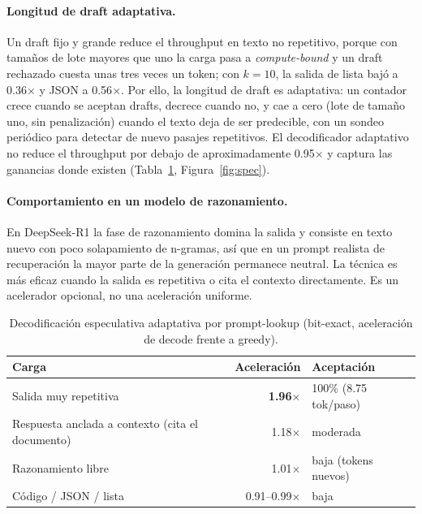 \documentclass[10pt,a4paper]{article}
\begin{document}
\paragraph{Longitud de draft adaptativa.} Un draft fijo y grande reduce el throughput en texto no repetitivo, porque con tamaños de lote mayores que uno la carga pasa a \emph{compute-bound} y un draft rechazado cuesta unas tres veces un token; con $k{=}10$, la salida de lista bajó a 0.36$\times$ y JSON a 0.56$\times$. Por ello, la longitud de draft es adaptativa: un contador crece cuando se aceptan drafts, decrece cuando no, y cae a cero (lote de tamaño uno, sin penalización) cuando el texto deja de ser predecible, con un sondeo periódico para detectar de nuevo pasajes repetitivos. El decodificador adaptativo no reduce el throughput por debajo de aproximadamente 0.95$\times$ y captura las ganancias donde existen (Tabla~\ref{tab:spec}, Figura~\ref{fig:spec}).

\paragraph{Comportamiento en un modelo de razonamiento.} En DeepSeek-R1 la fase de razonamiento domina la salida y consiste en texto nuevo con poco solapamiento de n-gramas, así que en un prompt realista de recuperación la mayor parte de la generación permanece neutral. La técnica es más eficaz cuando la salida es repetitiva o cita el contexto directamente. Es un acelerador opcional, no una aceleración uniforme.

\begin{table}[H]
\centering\small
\caption{Decodificación especulativa adaptativa por prompt-lookup (bit-exact, aceleración de decode frente a greedy).}
\label{tab:spec}
\begin{tabularx}{\textwidth}{Xrl}
\toprule
\textbf{Carga} & \textbf{Aceleración} & \textbf{Aceptación} \\
\midrule
Salida muy repetitiva & \textbf{1.96$\times$} & 100\% (8.75 tok/paso) \\
Respuesta anclada a contexto (cita el documento) & 1.18$\times$ & moderada \\
Razonamiento libre & 1.01$\times$ & baja (tokens nuevos) \\
Código / JSON / lista & 0.91--0.99$\times$ & baja \\
\bottomrule
\end{tabularx}
\end{table}
\end{document}
